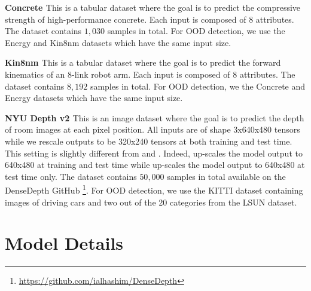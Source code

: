 \textbf{Concrete \citep{uci_datasets}} This is a tabular dataset where the goal is to predict the compressive strength of high-performance concrete. Each input is composed of $8$ attributes. The dataset contains $1,030$ samples in total. For OOD detection, we use the Energy and Kin8nm datasets which have the same input size.

\textbf{Kin8nm \citep{uci_datasets}} This is a tabular dataset where the goal is to predict the forward kinematics of an 8-link robot arm. Each input is composed of $8$ attributes. The dataset contains $8,192$ samples in total. For OOD detection, we the Concrete and Energy datasets which have the same input size.

\textbf{NYU Depth v2 \citep{nyu-depth}} This is an image dataset where the goal is to predict the depth of room images at each pixel position. All inputs are of shape 3x640x480 tensors while we rescale outputs to be 320x240 tensors at both training and test time. This setting is slightly different from \citet{uncertainty-bayesian-computer-vision} and \citet{nyu-depth}. Indeed, \citep{uncertainty-bayesian-computer-vision} up-scales the model output to 640x480 at training and test time while \citep{nyu-depth} up-scales the model output to 640x480 at test time only. The dataset contains $50,000$ samples in total available on the DenseDepth GitHub \footnote{\url{https://github.com/ialhashim/DenseDepth}}. For OOD detection, we use the KITTI \citep{kitti} dataset containing images of driving cars and two out of the 20 categories from the LSUN \citep{lsun} dataset.

\section{Model Details}
\label{sec:model}

